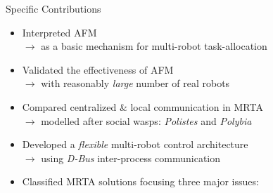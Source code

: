 \documentclass{beamer}
\begin{document}
\begin{frame}[t]{Specific Contributions}
\begin{itemize}
    \item \alert{Interpreted AFM}\\ 
$\rightarrow$ \small as a basic mechanism for multi-robot task-allocation%
    \item \normalsize \alert{Validated the effectiveness of AFM}\\
$\rightarrow$ \small with reasonably \textit{large} number of real robots %
\item \normalsize \alert{Compared centralized \& local communication in MRTA}\\%
$\rightarrow$ \small modelled after social wasps: \textit{Polistes} and \textit{Polybia}
\item \normalsize \alert{Developed a \textit{flexible} multi-robot control architecture}\\ 
$\rightarrow$ \small using \textit{D-Bus} inter-process communication %
\item \normalsize \alert{Classified MRTA solutions focusing three major issues:}\\ 
\begin{enumerate}
\end{enumerate}
\end{itemize}
\end{frame}

\end{document}
